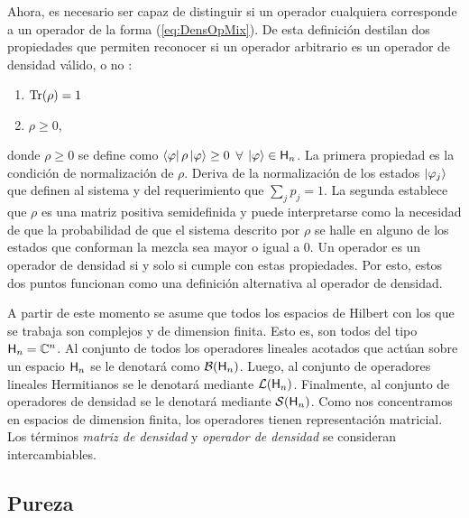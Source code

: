 \fi

Ahora, es necesario ser capaz de distinguir si un operador cualquiera corresponde a un operador de la forma (\ref{eq:DensOpMix}). De esta definición destilan dos propiedades que permiten reconocer si un operador arbitrario es un operador de densidad válido, o no \cite{Holevo}:
\begin{enumerate}
    \item $\Tr(\rho)=1$
    \item $\rho\geq 0$,
\end{enumerate}
donde $\rho\geq 0$ se define como $\bra{\varphi}\rho\ket{\varphi}\geq 0$ $\forall$ $\ket{\varphi}\in{\sf H}_{n}$.
La primera propiedad es la condición de normalización de $\rho$. Deriva de la normalización de los estados $\ket{\varphi_{j}}$ que definen al sistema y del requerimiento que $\sum_{j}p_{j}=1$. La segunda establece que $\rho$ es una matriz positiva semidefinida y puede interpretarse como la necesidad de que la probabilidad de que el sistema descrito por $\rho$ se halle en alguno de los estados que conforman la mezcla sea mayor o igual a $0$. Un operador es un operador de densidad si y solo si cumple con estas propiedades. Por esto, estos dos puntos funcionan como una definición alternativa al operador de densidad.


A partir de este momento se asume que todos los espacios de Hilbert con los que se trabaja son complejos y de dimension finita. Esto es, son todos del tipo ${\sf H}_{n}=\mathbb{C}^{n}$. Al conjunto de todos los operadores lineales acotados que actúan sobre un espacio ${\sf H}_{n}$ se le denotará como $\mathcal{B}({\sf H}_{n})$. Luego, al conjunto de operadores lineales Hermitianos se le denotará mediante $\mathcal{L}({\sf H}_{n})$. Finalmente, al conjunto de operadores de densidad se le denotará mediante $\mathcal{S}({\sf H}_{n})$. Como nos concentramos en espacios de dimension finita, los operadores tienen representación matricial. Los términos \textit{matriz de densidad} y \textit{operador de densidad} se consideran intercambiables.



\subsection{Pureza}
\label{subsec:ch2_purity}

